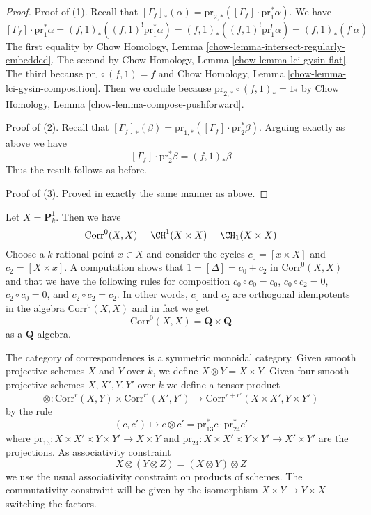 \begin{proof}
Proof of (1). Recall that
$[\Gamma_f]_*(\alpha) =
\text{pr}_{2, *}([\Gamma_f] \cdot \text{pr}_1^*\alpha)$.
We have
$$
[\Gamma_f] \cdot \text{pr}_1^*\alpha =
(f, 1)_*((f, 1)^! \text{pr}_1^*\alpha) =
(f, 1)_*((f, 1)^! \text{pr}_1^!\alpha) =
(f, 1)_*(f^!\alpha)
$$
The first equality by Chow Homology, Lemma
\ref{chow-lemma-intersect-regularly-embedded}.
The second by 
Chow Homology, Lemma \ref{chow-lemma-lci-gysin-flat}.
The third because $\text{pr}_1 \circ (f, 1) = f$ and
Chow Homology, Lemma \ref{chow-lemma-lci-gysin-composition}.
Then we coclude because
$\text{pr}_{2, *} \circ (f, 1)_* = 1_*$ by
Chow Homology, Lemma \ref{chow-lemma-compose-pushforward}.

\medskip\noindent
Proof of (2). Recall that $[\Gamma_f]_*(\beta) =
\text{pr}_{1, *}([\Gamma_f] \cdot \text{pr}_2^*\beta)$.
Arguing exactly as above we have
$$
[\Gamma_f] \cdot \text{pr}_2^*\beta = (f, 1)_*\beta
$$
Thus the result follows as before.

\medskip\noindent
Proof of (3). Proved in exactly the same manner as above.
\end{proof}

\begin{example}
\label{example-decompose-P1}
Let $X = \mathbf{P}^1_k$. Then we have
$$
\text{Corr}^0(X, X) = \CH^1(X \times X) = \CH_1(X \times X)
$$
Choose a $k$-rational point $x \in X$ and
consider the cycles $c_0 = [x \times X]$ and $c_2 = [X \times x]$.
A computation shows that $1 = [\Delta] = c_0 + c_2$ in $\text{Corr}^0(X, X)$
and that we have the following rules for composition
$c_0 \circ c_0 = c_0$,
$c_0 \circ c_2 = 0$,
$c_2 \circ c_0 = 0$, and
$c_2 \circ c_2 = c_2$.
In other words, $c_0$ and $c_2$ are orthogonal idempotents in
the algebra $\text{Corr}^0(X, X)$ and in fact we get
$$
\text{Corr}^0(X, X) = \mathbf{Q} \times \mathbf{Q}
$$
as a $\mathbf{Q}$-algebra.
\end{example}

\noindent
The category of correspondences is a symmetric monoidal category.
Given smooth projective schemes $X$ and $Y$ over $k$, we define
$X \otimes Y = X \times Y$. Given four smooth projective schemes
$X, X', Y, Y'$ over $k$ we define a tensor product
$$
\otimes :
\text{Corr}^r(X, Y) \times \text{Corr}^{r'}(X', Y')
\longrightarrow
\text{Corr}^{r + r'}(X \times X', Y \times Y')
$$
by the rule
$$
(c, c') \longmapsto
c \otimes c' = \text{pr}_{13}^*c \cdot \text{pr}_{24}^*c'
$$
where $\text{pr}_{13} : X \times X' \times Y \times Y' \to X \times Y$
and $\text{pr}_{24} : X \times X' \times Y \times Y' \to X' \times Y'$
are the projections. As associativity constraint
$$
X \otimes (Y \otimes Z) = (X \otimes Y) \otimes Z
$$
we use the usual associativity constraint on products of schemes.
The commutativity constraint will be given by the isomorphism
$X \times Y \to Y \times X$ switching the factors.


